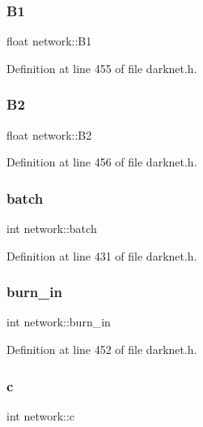 \subsubsection{\texorpdfstring{B1}{B1}}
{\footnotesize\ttfamily float network\+::\+B1}



Definition at line 455 of file darknet.\+h.

\mbox{\label{structnetwork_a42ea583b98356e06dca647bf95520e5c}} 
\subsubsection{\texorpdfstring{B2}{B2}}
{\footnotesize\ttfamily float network\+::\+B2}



Definition at line 456 of file darknet.\+h.

\mbox{\label{structnetwork_a04f448f3f8c3f1314e2b23b429bec827}} 
\subsubsection{\texorpdfstring{batch}{batch}}
{\footnotesize\ttfamily int network\+::batch}



Definition at line 431 of file darknet.\+h.

\mbox{\label{structnetwork_a1e0395e7cbcd9cd93d5c8621bb1a38aa}} 
\subsubsection{\texorpdfstring{burn\_in}{burn\_in}}
{\footnotesize\ttfamily int network\+::burn\+\_\+in}



Definition at line 452 of file darknet.\+h.

\mbox{\label{structnetwork_a05014921b926874b8a362aa83d98283a}} 
\subsubsection{\texorpdfstring{c}{c}}
{\footnotesize\ttfamily int network\+::c}



